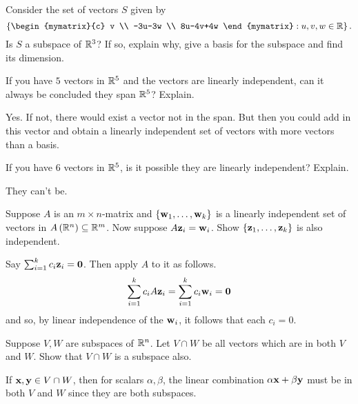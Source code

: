 \begin{enumialphparenastyle}
\begin{ex} Consider the set of vectors $S$ given by  
\begin{equation*}
\set{\begin{mymatrix}{c}
v \\ 
-3u-3w \\ 
8u-4v+4w
\end{mymatrix} :u,v,w\in \R} .
\end{equation*}
Is $S$ a subspace of $\mathbb{R}^{3}$? If so, explain why,
give a basis for the subspace and find its dimension.
\end{ex}

\begin{ex} If you have $5$ vectors in $\mathbb{R}^{5}$ and the vectors are
linearly independent, can it always be concluded they span $\mathbb{R}^{5}$?
Explain. 
\begin{sol}
 Yes. If not, there would exist a vector not in the span. But then
you could add in this vector and obtain a linearly independent set of
vectors with more vectors than a basis.
\end{sol}
\end{ex}

\begin{ex} If you have $6$ vectors in $\mathbb{R}^{5}$, is it possible they are
linearly independent? Explain.
\begin{sol}
They can't be.
\end{sol}
\end{ex}


\begin{ex} Suppose $A$ is an $m\times n$-matrix and $\left\{\mbox{\bf w}
_{1},\ldots,\mbox{\bf w}_{k}\right\} $ is a linearly independent set of
vectors in $A\left(\mathbb{R}^{n}\right) \subseteq \mathbb{R}^{m}$. Now
suppose $A\mbox{\bf z}_{i}=\mbox{\bf w}_{i}$. Show $\left\{
\mbox{\bf z}_{1},\ldots,\mbox{\bf z}_{k}\right\} $ is also independent. 
\begin{sol}
 Say $
\sum_{i=1}^{k}c_{i}\mbox{\bf z}_{i}=\mbox{\bf 0}$. Then apply $A$ to it as follows.
\[
\sum_{i=1}^{k}c_{i}A\mbox{\bf z}_{i}=\sum_{i=1}^{k}c_{i}\mbox{\bf w}_{i}=\mbox{\bf 0}
\]
and so, by linear independence of the $\mbox{\bf w}_{i}$, it follows that each
$c_{i}=0$.
\end{sol}
\end{ex}

\begin{ex} Suppose $V, W$ are subspaces of $\mathbb{R}^{n}$. Let $V\cap W$
be all vectors which are in both $V$ and $W$. Show that $V \cap W$ is a subspace also. 
\begin{sol}
If $\mbox{\bf x}, \mbox{\bf y}\in V\cap W$, then for scalars $\alpha
,\beta$, the linear combination $\alpha \mbox{\bf x}+\beta \mbox{\bf y}$ must
be in both $V$ and $W$ since they are both subspaces.
\end{sol}
\end{ex}


\end{enumialphparenastyle}
